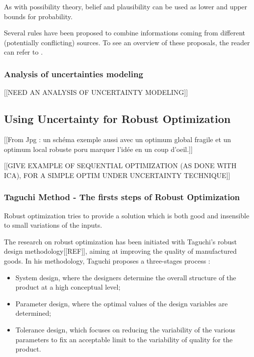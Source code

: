 As with possibility theory, belief and plausibility can be used as lower and upper bounds for probability.

Several rules have been proposed to combine informations coming from different (potentially conflicting) sources. To see an overview of these proposals, the reader can refer to \cite{sentz2002combination}.

\subsubsection{Analysis of uncertainties modeling}

[[NEED AN ANALYSIS OF UNCERTAINTY MODELING]]

\subsection{Using Uncertainty for Robust Optimization}

[[From Jpg : un schéma exemple aussi avec un optimum global fragile et un optimum local robuste poru marquer l'idée en un coup d'oeil.]]

[[GIVE EXAMPLE OF SEQUENTIAL OPTIMIZATION (AS DONE WITH ICA), FOR A SIMPLE OPTIM UNDER UNCERTAINTY TECHNIQUE]]

\subsubsection{Taguchi Method - The firsts steps of Robust Optimization }

Robust optimization tries to provide a solution which is both good and insensible to small variations of the inputs.

The research on robust optimization has been initiated with Taguchi's robust design methodology[[REF]], aiming at improving the quality of manufactured goods.
In his methodology, Taguchi proposes a three-stages process :
\begin{itemize}
\item System design, where the designers determine the overall structure of the product at a high conceptual level;
\item Parameter design, where the optimal values of the design variables are determined;
\item Tolerance design, which focuses on reducing the variability of the  various parameters to fix an acceptable limit to the variability of quality for the product.
\end{itemize}

